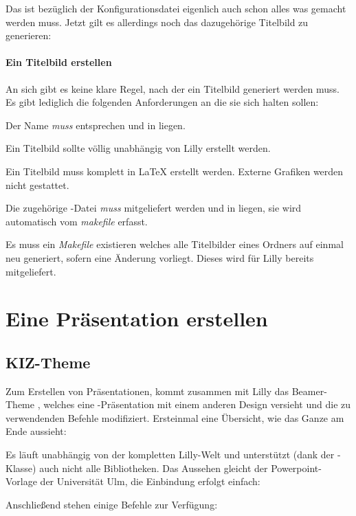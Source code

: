 Das ist bezüglich der Konfigurationsdatei eigenlich auch schon alles was gemacht werden muss. Jetzt gilt es allerdings noch das dazugehörige Titelbild zu generieren:

\paragraph{Ein Titelbild erstellen}
An sich gibt es keine klare Regel, nach der ein Titelbild generiert werden muss. Es gibt lediglich die folgenden Anforderungen an die sie sich halten sollen:
\begin{ditemize}
    \item Der Name \emph{muss}  entsprechen und in  liegen.
    \item Ein Titelbild sollte völlig unabhängig von Lilly erstellt werden.
    \item Ein Titelbild muss komplett in \LaTeX{} erstellt werden. Externe Grafiken werden nicht gestattet.
    \item Die zugehörige -Datei \emph{muss} mitgeliefert werden und in  liegen, sie wird automatisch vom \emph{makefile} erfasst.
    \item Es muss ein \emph{Makefile} existieren welches alle Titelbilder eines Ordners auf einmal neu generiert, sofern eine Änderung vorliegt. Dieses wird für Lilly bereits mitgeliefert.
\end{ditemize}

\section{Eine Präsentation erstellen}
\subsection{KIZ-Theme}
Zum Erstellen von Präsentationen, kommt zusammen mit Lilly das Beamer-Theme , welches eine -Präsentation mit einem anderen Design versieht und die zu verwendenden Befehle modifiziert. Ersteinmal eine Übersicht, wie das Ganze am Ende aussieht:
\begin{tcbraster}[raster columns=3, blankest, graphics pages={1,4,5}, colback=white]
\end{tcbraster}
Es läuft unabhängig von der kompletten Lilly-Welt und unterstützt (dank der -Klasse) auch nicht alle Bibliotheken. Das Aussehen gleicht der Powerpoint-Vorlage der Universität Ulm, die Einbindung erfolgt einfach:
Anschließend stehen einige Befehle zur Verfügung:

